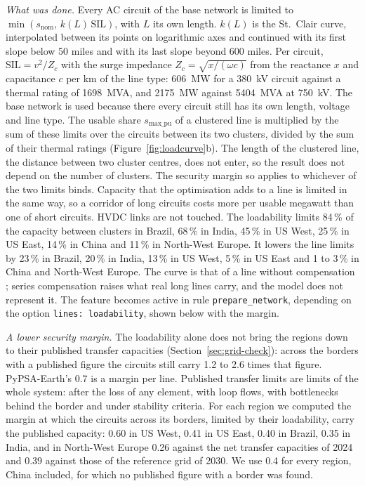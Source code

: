 \textit{What was done.}
Every AC circuit of the base network is limited to $\min(s_\text{nom},\, k(L)\,\mathrm{SIL})$, with $L$ its own length.
$k(L)$ is the St.~Clair curve, interpolated between its points on logarithmic axes and continued with its first slope below 50 miles and with its last slope beyond 600 miles.
Per circuit, $\mathrm{SIL} = v^2 / Z_c$ with the surge impedance $Z_c = \sqrt{x / (\omega c)}$ from the reactance $x$ and capacitance $c$ per km of the line type: \SI{606}{MW} for a \SI{380}{kV} circuit against a thermal rating of \SI{1698}{MVA}, and \SI{2175}{MW} against \SI{5404}{MVA} at \SI{750}{kV}.
The base network is used because there every circuit still has its own length, voltage and line type.
The usable share $s_\text{max\_pu}$ of a clustered line is multiplied by the sum of these limits over the circuits between its two clusters, divided by the sum of their thermal ratings (Figure~\ref{fig:loadcurve}b).
The length of the clustered line, the distance between two cluster centres, does not enter, so the result does not depend on the number of clusters.
The security margin so applies to whichever of the two limits binds.
Capacity that the optimisation adds to a line is limited in the same way, so a corridor of long circuits costs more per usable megawatt than one of short circuits.
HVDC links are not touched.
The loadability limits 84\,\% of the capacity between clusters in Brazil, 68\,\% in India, 45\,\% in US West, 25\,\% in US East, 14\,\% in China and 11\,\% in North-West Europe.
It lowers the line limits by 23\,\% in Brazil, 20\,\% in India, 13\,\% in US West, 5\,\% in US East and 1 to 3\,\% in China and North-West Europe.
The curve is that of a line without compensation \citep{sekhon1981}; series compensation raises what real long lines carry, and the model does not represent it.
The feature becomes active in rule \texttt{prepare\_network}, depending on the option \texttt{lines: loadability}, shown below with the margin.

\textit{A lower security margin.}
The loadability alone does not bring the regions down to their published transfer capacities (Section~\ref{sec:grid-check}): across the borders with a published figure the circuits still carry 1.2 to 2.6 times that figure.
PyPSA-Earth's 0.7 is a margin per line.
Published transfer limits are limits of the whole system: after the loss of any element, with loop flows, with bottlenecks behind the border and under stability criteria.
For each region we computed the margin at which the circuits across its borders, limited by their loadability, carry the published capacity: 0.60 in US West, 0.41 in US East, 0.40 in Brazil, 0.35 in India, and in North-West Europe 0.26 against the net transfer capacities of 2024 and 0.39 against those of the reference grid of 2030.
We use 0.4 for every region, China included, for which no published figure with a border was found.

